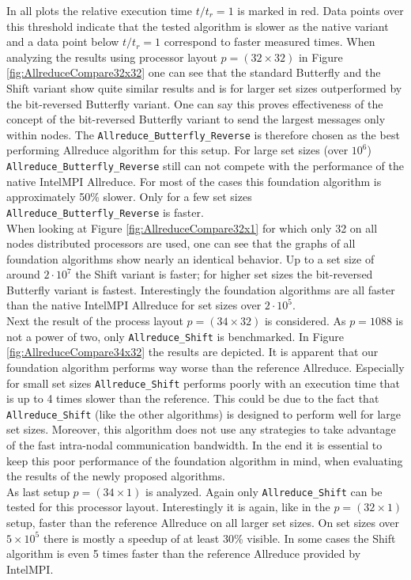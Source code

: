In all plots the relative execution time $t/t_r=1$ is marked in red. Data points over this threshold indicate that the tested algorithm is slower as the native variant and a data point below $t/t_r=1$ correspond to faster measured times. When analyzing the results using processor layout $p=(32\times32)$ in Figure \ref{fig:AllreduceCompare32x32} one can see that the standard Butterfly and the Shift variant show quite similar results and is for larger set sizes outperformed by the bit-reversed Butterfly variant. 
One can say this proves effectiveness of the concept of the bit-reversed Butterfly variant to send the largest messages only within nodes.  The \texttt{All\-re\-duce\_But\-ter\-fly\_Reverse} is therefore chosen as the best performing Allreduce algorithm for this setup. For large set sizes (over $10^6$) \texttt{All\-re\-duce\_But\-ter\-fly\_Reverse} still can not compete with the performance of the native IntelMPI Allreduce. For most of the cases this foundation algorithm is approximately 50\% slower. Only for a few set sizes \texttt{All\-re\-duce\_But\-ter\-fly\_Reverse} is faster.\\
When looking at Figure \ref{fig:AllreduceCompare32x1} for which only 32 on all nodes distributed processors are used, one can see that the graphs of all foundation algorithms show nearly an identical behavior. Up to a set size of around $2\cdot 10^7$ the Shift variant is faster; for higher set sizes the bit-reversed Butterfly variant is fastest. Interestingly the foundation algorithms are all faster than the native IntelMPI Allreduce for set sizes over $2\cdot10^5$.\\
Next the result of the process layout $p=(34\times32)$ is considered. As $p=1088$ is not a power of two, only \texttt{All\-re\-duce\-\_Shift} is benchmarked. In Figure \ref{fig:AllreduceCompare34x32} the results are depicted. It is apparent that our foundation algorithm performs way worse than the reference Allreduce. Especially for small set sizes \texttt{All\-re\-duce\-\_Shift} performs poorly with an execution time that is up to 4 times slower than the reference.
This could be due to the fact that  \texttt{All\-re\-duce\-\_Shift} (like the other algorithms) is designed to perform well for large set sizes.
Moreover, this algorithm does not use any strategies to take advantage of the fast intra-nodal communication bandwidth. 
In the end it is essential to keep this poor performance of the foundation algorithm in mind, when evaluating the results of the newly proposed algorithms.\\
As last setup $p=(34\times1)$ is analyzed. Again only \texttt{All\-re\-duce\-\_Shift} can be tested for this processor layout. Interestingly it is again, like in the $p=(32\times1)$ setup, faster than the reference Allreduce on all larger set sizes. 
On set sizes over $5\times10^5$ there is mostly a speedup of at least 30\% visible. In some cases the Shift algorithm is even 5 times faster than the reference Allreduce provided by IntelMPI.

